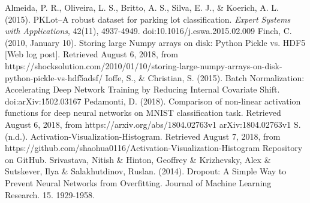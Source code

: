 \documentclass[a4paper, 11pt]{article} %
\begin{document}
\newpage
\begin{thebibliography}{unsrt}
		Almeida, P. R., Oliveira, L. S., Britto, A. S., Silva, E. J., \& Koerich, A. L. (2015). PKLot--A robust 
		dataset for parking lot classification. \textit{Expert Systems with Applications}, 42(11), 
		4937-4949. doi:10.1016/j.eswa.2015.02.009
		Finch, C. (2010, January 10). Storing large Numpy arrays on disk: 
		Python Pickle vs. HDF5 [Web log post]. Retrieved August 6, 2018, from 
		https://shocksolution.com/2010/01/10/storing-large-numpy-arrays-on-disk-python-pickle-vs-hdf5adsf/
		Ioffe, S., \& Christian, S. (2015). Batch Normalization: Accelerating 
		Deep Network Training by Reducing Internal Covariate Shift. 
		doi:arXiv:1502.03167
		Pedamonti, D. (2018). Comparison of non-linear activation functions for 
		deep neural networks on MNIST classification task. Retrieved August 6, 
		2018, from https://arxiv.org/abs/1804.02763v1 arXiv:1804.02763v1
		S. (n.d.). Activation-Visualization-Histogram. Retrieved August 7, 
		2018, from 
		https://github.com/shaohua0116/Activation-Visualization-Histogram 
		Repository on GitHub.
		Srivastava, Nitish \& Hinton, Geoffrey \& Krizhevsky, Alex \& 
		Sutskever, Ilya \& Salakhutdinov, Ruslan. (2014). Dropout: A Simple Way 
		to Prevent Neural Networks from Overfitting. Journal of Machine 
		Learning Research. 15. 1929-1958.
\end{thebibliography}
\end{document}
